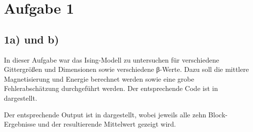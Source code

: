 \section*{Aufgabe 1}
\subsection{1a) und b)}
In dieser Aufgabe war das Ising-Modell zu untersuchen für verschiedene Gittergrößen
und Dimensionen sowie verschiedene β-Werte. Dazu soll die mittlere Magnetisierung 
und Energie berechnet werden sowie eine grobe Fehlerabschätzung durchgeführt werden.
Der entsprechende Code ist in  dargestellt.



Der entsprechende Output ist in  dargestellt, wobei jeweils alle
zehn Block-Ergebnisse und der resultierende Mittelwert gezeigt wird.

